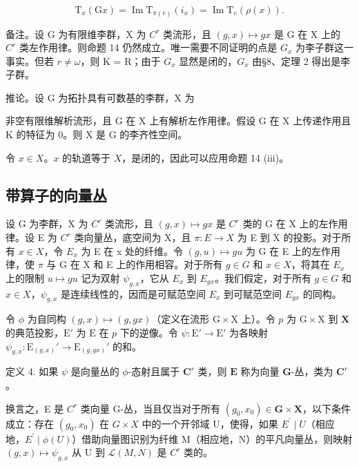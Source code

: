 \[
\mathrm{T} _ {x} (\mathrm{G} x) = \operatorname{Im} \mathrm{T} _ {\pi (e)} (i _ {x}) = \operatorname{Im} \mathrm{T} _ {e} (\rho (x)).
\]

备注。设 G 为有限维李群，X 为 \(C^{r}\) 类流形，且 \((g, x) \mapsto gx\) 是 G 在 X 上的 \(C^{r}\) 类左作用律。则命题 14 仍然成立。唯一需要不同证明的点是 \(G_{x}\) 为李子群这一事实。但若 \(r \neq \omega\)，则 K = R；由于 \(G_{x}\) 显然是闭的，\(G_{x}\) 由§8、定理 2 得出是李子群。

推论。设 G 为拓扑具有可数基的李群，X 为

非空有限维解析流形，且 G 在 X 上有解析左作用律。假设 G 在 X 上传递作用且 K 的特征为 0。则 X 是 G 的李齐性空间。

令 \(x \in X\)。\(x\) 的轨道等于 \(X\)，是闭的，因此可以应用命题 14 (iii)。

\subsection{带算子的向量丛}

设 G 为李群，X 为 \(C^{r}\) 类流形，且 \((g, x) \mapsto gx\) 是 \(C^{r}\) 类的 G 在 X 上的左作用律。设 E 为 \(C^{r}\) 类向量丛，底空间为 X，且 \(\pi: E \to X\) 为 E 到 X 的投影。对于所有 \(x \in X\)，令 \(E_{x}\) 为 E 在 x 处的纤维。令 \((g, u) \mapsto gu\) 为 G 在 E 上的左作用律，使 \(\pi\) 与 G 在 X 和 E 上的作用相容。对于所有 \(g \in G\) 和 \(x \in X\)，将其在 \(E_{x}\) 上的限制 \(u \mapsto gu\) 记为双射 \(\psi_{g,x}\)，它从 \(E_{x}\) 到 \(E_{gx}\)。我们假定，对于所有 \(g \in G\) 和 \(x \in X\)，\(\psi_{g,x}\) 是连续线性的，因而是可赋范空间 \(E_{x}\) 到可赋范空间 \(E_{gx}\) 的同构。

令 \(\phi\) 为自同构 \((g,x)\mapsto (g,gx)\)（定义在流形 \(\mathrm{G}\times \mathrm{X}\) 上）。令 \(p\) 为 \(\mathrm{G}\times \mathrm{X}\) 到 \(\mathbf{X}\) 的典范投影，\(\mathrm{E}'\) 为 \(\mathrm{E}\) 在 \(p\) 下的逆像。令 \(\psi \colon \mathrm{E}'\to \mathrm{E}'\) 为各映射 \(\psi_{g,x}\colon \mathrm{E}_{(g,x)}'\to \mathrm{E}_{(g,gx)}'\) 的和。

定义 4. 如果 \(\psi\) 是向量丛的 \(\phi\)-态射且属于 \(\mathbf{C}^r\) 类，则 \(\mathbf{E}\) 称为向量 \(\mathbf{G}\)-丛，类为 \(\mathbf{C}^r\)。

换言之，E 是 \(C^{r}\) 类向量 G-丛，当且仅当对于所有 \((g_{0}, x_{0}) \in \mathbf{G} \times \mathbf{X}\)，以下条件成立：存在 \((g_{0}, x_{0})\) 在 \(G \times X\) 中的一个开邻域 U，使得，如果 \(E^{\prime} \mid U\)（相应地，\(E^{\prime} \mid \phi(U)\)）借助向量图识别为纤维 M（相应地，N）的平凡向量丛，则映射 \((g, x) \mapsto \psi_{g,x}\) 从 U 到 \(\mathcal{L}(M, N)\) 是 \(C^{r}\) 类的。


